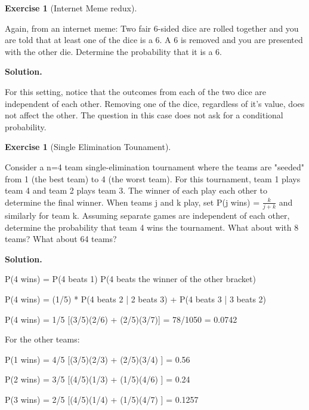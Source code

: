 \documentclass[10pt,]{book}
\theoremstyle{plain}
\theoremstyle{definition}
\theoremstyle{definition}
\theoremstyle{definition}
\newtheorem{exercise}[theorem]{Exercise}
\numberwithin{equation}{section}
\begin{document}
\begin{exercise}[{Internet Meme redux}]\label{exercise-29}

	Again, from an internet meme:  Two fair 6-sided dice are rolled together and you are told that at least one of the dice is a 6. A 6 is removed and you are presented with the other die.  Determine the probability that it is a 6.
\par\smallskip
\noindent\textbf{Solution.}\hypertarget{solution-8}{}\quad

	For this setting, notice that the outcomes from each of the two dice are independent of each other. Removing one of the dice, regardless of it's value, does not affect the other. The question in this case does not ask for a conditional probability.
\end{exercise}
\begin{exercise}[{Single Elimination Tounament}]\label{exercise-30}

	Consider a n=4 team single-elimination tournament where the teams are "seeded" from 1 (the best team) to 4 (the worst team).  For this tournament, team 1 plays team 4 and team 2 plays team 3. The winner of each play each other to determine the final winner. When teams j and k play, set P(j wins) = \(\frac{k}{j+k}\) and similarly for team k.  Assuming separate games are independent of each other, determine the probability that team 4 wins the tournament. What about with 8 teams? What about 64 teams?
\par\smallskip
\noindent\textbf{Solution.}\hypertarget{solution-9}{}\quad

	P(4 wins) = P(4 beats 1) P(4 beats the winner of the other bracket)
\par

	P(4 wins) = (1/5) * P(4 beats 2 | 2 beats 3) + P(4 beats 3 | 3 beats 2)
\par

	P(4 wins) = 1/5 [(3/5)(2/6) + (2/5)(3/7)] = 78/1050 = 0.0742
\par

	For the other teams:
\par

	P(1 wins) = 4/5 [(3/5)(2/3) + (2/5)(3/4) ] = 0.56
\par

	P(2 wins) = 3/5 [(4/5)(1/3) + (1/5)(4/6) ] = 0.24
\par

	P(3 wins) = 2/5 [(4/5)(1/4) + (1/5)(4/7) ] = 0.1257
\end{exercise}
\typeout{************************************************}
\typeout{************************************************}
\end{document}
